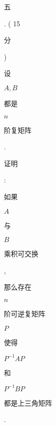 \documentclass[10pt]{article}
\begin{document}
\begin{CJK}{UTF8}{mj}五\end{CJK}. ( 15 \begin{CJK}{UTF8}{mj}分\end{CJK}) \begin{CJK}{UTF8}{mj}设\end{CJK} $A, B$ \begin{CJK}{UTF8}{mj}都是\end{CJK} $n$ \begin{CJK}{UTF8}{mj}阶复矩阵\end{CJK}. \begin{CJK}{UTF8}{mj}证明\end{CJK}: \begin{CJK}{UTF8}{mj}如果\end{CJK} $A$ \begin{CJK}{UTF8}{mj}与\end{CJK} $B$ \begin{CJK}{UTF8}{mj}乘积可交换\end{CJK}, \begin{CJK}{UTF8}{mj}那么存在\end{CJK} $n$ \begin{CJK}{UTF8}{mj}阶可逆复矩阵\end{CJK} $P$ \begin{CJK}{UTF8}{mj}使得\end{CJK} $P^{-1} A P$ \begin{CJK}{UTF8}{mj}和\end{CJK} $P^{-1} B P$ \begin{CJK}{UTF8}{mj}都是上三角矩阵\end{CJK}.
\end{document}

